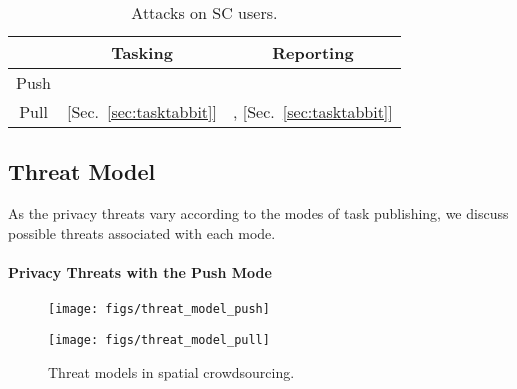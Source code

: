 \documentclass{USC-Thesis}
\numberwithin{equation}{chapter}
\begin{document}
\begin{table}
\begin{center}
\begin{tabular}{ | c | c | c | } 
\hline
					& Tasking 				& Reporting \\
\hline
Push 	& \cite{kazemi2011privacy} 	& \cite{Shin2011}  \\  
\hline
Pull 	&  	[Sec.~\ref{sec:tasktabbit}]						& \cite{Wang2016,Shin2011}, [Sec.~\ref{sec:tasktabbit}] \\ 
\hline
\end{tabular}
\caption{Attacks on SC users.}
\label{tab:threats}
\end{center}
\end{table}

\subsection{Threat Model}
\label{sec:threat_model}
As the privacy threats vary according to the modes of task publishing, we discuss possible threats associated with each mode.

\paragraph{\textbf{Privacy Threats with the Push Mode}}

\begin{figure*}[ht]
	\begin{minipage}[b]{0.48\linewidth}
		\centering
		\texttt{[image: figs/threat\_model\_push]}
		\label{fig:threat_model_push}
	\end{minipage}
	\hspace{4pt}
	\begin{minipage}[b]{.48\linewidth}
		\centering
		\texttt{[image: figs/threat\_model\_pull]}
		\label{fig:threat_model_pull}
	\end{minipage}
	\caption{Threat models in spatial crowdsourcing.}
	\label{fig:threat_model}
\end{figure*}
\end{document}
